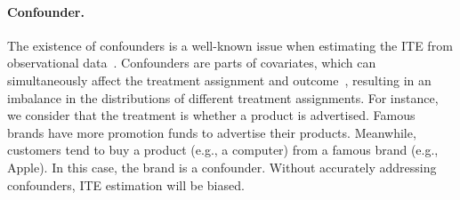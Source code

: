 \documentclass[runningheads]{llncs}
\begin{document}
\paragraph{Confounder.} The existence of confounders is a well-known issue when estimating the ITE from observational data~\cite{pmlr-v70-shalit17a}. Confounders are parts of covariates, which can simultaneously  affect the treatment assignment and outcome~\cite{yao2021survey}, resulting in an imbalance in the distributions of different treatment assignments.
For instance, we consider that the treatment is whether a product is advertised. 
Famous brands have more promotion funds to advertise their products.
Meanwhile, customers tend to buy a product (e.g., a computer) from a famous brand (e.g., Apple).
In this case, the brand is a confounder. Without accurately addressing  confounders,  ITE estimation will be biased.



\end{document}
